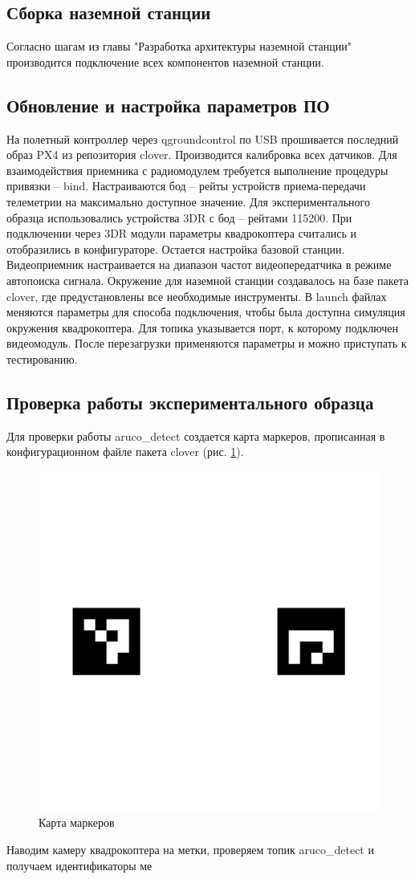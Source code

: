 \subsection{Сборка наземной станции}
Согласно шагам из главы "Разработка архитектуры наземной станции" про\-из\-водится подключение всех компонентов наземной станции.
\subsection{Обновление и настройка параметров ПО}
На полетный контроллер через qgroundcontrol по USB прошивается последний образ PX4 из репозитория clover. Производится калибровка всех датчиков. Для взаимодействия приемника с радиомодулем требуется выполнение процедуры привязки -- bind.
Настраиваются бод -- рейты устройств приема-передачи телеметрии на максимально доступное значение. Для экспериментального образца использовались устройства 3DR с бод -- рейтами 115200. При подключении через 3DR модули параметры квадрокоптера считались и отобразились в конфигураторе. Остается настройка базовой станции. Видеоприемник настраивается на диапазон частот видеопередатчика в режиме автопоиска сигнала. Окружение для наземной станции создавалось на базе пакета clover, где предустановлены все необходимые инструменты. В launch файлах меняются параметры для способа подключения, чтобы была доступна симуляция окружения квадрокоптера. Для топика указывается порт, к которому подключен видеомодуль. После перезагрузки применяются параметры и можно приступать к тестированию.
\subsection{Проверка работы экспериментального образца}
Для проверки работы aruco\_detect создается карта маркеров, прописанная в конфигурационном файле пакета clover (рис. \ref{fig:map}).
\begin{figure}[H]
	\centering
	\includegraphics[width=0.5\linewidth]{../RW/pics/map}
	\caption{Карта маркеров
	}
	\label{fig:map}
\end{figure}
Наводим камеру квадрокоптера на метки, проверяем топик aruco\_detect и получаем идентификаторы ме